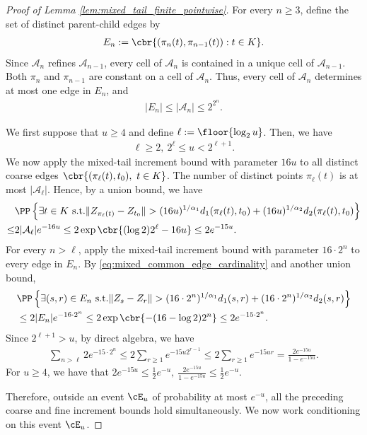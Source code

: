 \documentclass[11pt]{article}
\begin{document}
\begin{proof}[Proof of Lemma
\ref{lem:mixed_tail_finite_pointwise}]
For every $n\ge3$, define the set of distinct parent-child edges by
\begin{align*}
E_n
:=
\cbr{
(\pi_n(t),\pi_{n-1}(t)):
t\in K
}.
\end{align*}
Since $\mathcal A_n$ refines $\mathcal A_{n-1}$, every cell of
$\mathcal A_n$ is contained in a unique cell of
$\mathcal A_{n-1}$. Both $\pi_n$ and $\pi_{n-1}$ are constant on a
cell of $\mathcal A_n$. Thus, every cell of $\mathcal A_n$ determines
at most one edge in $E_n$, and
\begin{align}
|E_n|
\le
|\mathcal A_n|
\le
2^{2^n}.
\label{eq:mixed_common_edge_cardinality}
\end{align}

We first suppose that $u\ge4$ and define $\ell:=\floor{\log_2u}$. Then, we have
\begin{align*}
\ell\ge2,
\ 
2^\ell\le u<2^{\ell+1}.
\end{align*}
We now apply the mixed-tail increment bound with parameter $16u$ to all
distinct coarse edges $\cbr{(\pi_\ell(t),t_0),
\ t\in K}$. The number of distinct points $\pi_\ell(t)$ is at most
$|\mathcal A_\ell|$. Hence, by a union bound, we have
\begin{align*}
&\PP\left\{
\exists t\in K\ \text{s.t.} \|Z_{\pi_\ell(t)}-Z_{t_0}\|
>
(16u)^{1/\alpha_1}
d_1(\pi_\ell(t),t_0)
+
(16u)^{1/\alpha_2}
d_2(\pi_\ell(t),t_0)
\right\}\\
\le&2|\mathcal A_\ell|e^{-16u}\le
2\exp\cbr{(\log2)2^\ell-16u}\le
2e^{-15u}.
\end{align*}
For every $n>\ell$, apply the mixed-tail increment bound with parameter
$16\cdot2^n$ to every edge in $E_n$. By
\eqref{eq:mixed_common_edge_cardinality} and another union bound,
\begin{align*}
&\PP\left\{\exists (s,r)\in E_n\ \text{s.t.}\|Z_s-Z_r\|
>
(16\cdot2^n)^{1/\alpha_1}d_1(s,r)
+
(16\cdot2^n)^{1/\alpha_2}d_2(s,r)
\right\}\\
&\le
2|E_n|e^{-16\cdot2^n}\le
2\exp\cbr{-(16-\log2)2^n}\le
2e^{-15\cdot2^n}.
\end{align*}
Since $2^{\ell+1}>u$, by direct algebra, we have
\begin{align*}
\sum_{n>\ell}2e^{-15\cdot2^n}\le
2\sum_{r\ge1}e^{-15u2^{r-1}}\le
2\sum_{r\ge1}e^{-15ur}=
\frac{2e^{-15u}}{1-e^{-15u}}.
\end{align*}
For $u\ge4$,  we have that $2e^{-15u}
\le
\frac12e^{-u},
\ 
\frac{2e^{-15u}}{1-e^{-15u}}
\le
\frac12e^{-u}$. 

Therefore, outside an event $\cE_u$ of probability at most $e^{-u}$,
all the preceding coarse and fine increment bounds hold
simultaneously. We now work conditioning on this event $\cE_u$. 


\end{proof}
\end{document}
